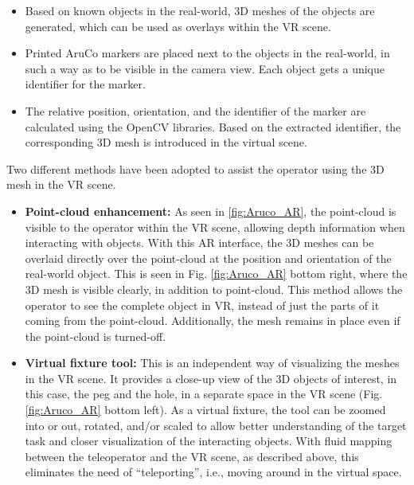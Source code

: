 \begin{itemize}
    \item Based on known objects in the real-world, 3D meshes of the objects are generated, which can be used as overlays within the VR scene. 
    \item Printed AruCo markers are placed next to the objects in the real-world, in such a way as to be visible in the camera view. Each object gets a unique identifier for the marker.
    \item The  relative  position,  orientation,  and  the  identifier  of  the  marker  are  calculated  using  the  OpenCV libraries. Based on the extracted identifier, the corresponding 3D mesh is introduced in the virtual scene. 
\end{itemize}


Two different methods have been adopted to assist the operator using the 3D mesh in the VR scene.

\begin{itemize}
    \item \textbf{Point-cloud  enhancement:}  As  seen  in \ref{fig:Aruco_AR},  the  point-cloud  is  visible  to  the  operator  within the VR scene, allowing depth information when interacting with objects. With this AR interface,  the  3D  meshes  can  be  overlaid  directly  over  the  point-cloud at  the  position  and  orientation  of  the  real-world  object.  This  is  seen  in  Fig. \ref{fig:Aruco_AR} bottom right,  where  the  3D  mesh  is  visible  clearly, in addition to point-cloud. This method allows the operator to see the complete object in  VR,  instead  of  just  the  parts  of  it  coming  from  the  point-cloud.  Additionally,  the  mesh  remains in place even if the point-cloud is turned-off.
    
    \item \textbf{Virtual fixture tool:} This is an independent way of visualizing the meshes in the VR scene. It provides a close-up view of the 3D objects of interest, in   this case, the peg and the hole, in a separate space in the VR scene (Fig. \ref{fig:Aruco_AR} bottom left). As a virtual fixture, the tool can be zoomed into or out,  rotated,  and/or  scaled  to  allow  better  understanding  of  the  target  task  and  closer  visualization of the interacting objects. With fluid mapping between the teleoperator and the VR scene, as described above, this eliminates the need of “teleporting”, i.e., moving around in the virtual space.
    
\end{itemize}

